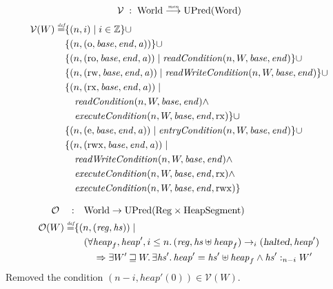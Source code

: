\documentclass{article}
\newcommand{\monfun}{\stackrel{\textit{\tiny{mon}}}{\longrightarrow}}
\newcommand{\defeq}{\stackrel{\textit{\tiny{def}}}{=}}
\newcommand{\union}{\mathbin{\cup}}
\newcommand{\var}[1]{\mathit{#1}}
\newcommand{\hs}{\var{hs}}
\newcommand{\addr}{\var{a}}
\newcommand{\start}{\var{base}}
\newcommand{\addrend}{\var{end}}
\newcommand{\reg}{\var{reg}}
\newcommand{\heap}{\var{heap}}
\newcommand{\perm}{\var{perm}}
\newcommand{\stdcap}[1][\perm]{\left(#1,\start,\addrend,\addr \right)}
\newcommand{\halted}{\textsl{halted}}
\newcommand{\plainfun}[2]{
  \ifthenelse{\equal{#2}{}}
             {\mathit{#1}}
             {\mathit{#1}(#2)}
}
\newcommand{\readCond}[1]{\plainfun{readCondition}{#1}}
\newcommand{\writeCond}[1]{\plainfun{readWriteCondition}{#1}}
\newcommand{\execCond}[1]{\plainfun{executeCondition}{#1}}
\newcommand{\entryCond}[1]{\plainfun{entryCondition}{#1}}
\newcommand{\future}{\mathbin{\sqsupseteq}}
\newcommand{\heapSat}[3][\heap]{#1 :_{#2} #3}
\newcommand{\asmType}{\plaindom{AsmType}}
\newcommand{\plaindom}[1]{\mathrm{#1}}
\newcommand{\Words}{\plaindom{Word}}
\newcommand{\Regs}{\plaindom{Reg}}
\newcommand{\HeapSegments}{\plaindom{HeapSegment}}
\newcommand{\ints}{\mathbb{Z}}
\newcommand{\Worlds}{\plaindom{World}}
\newcommand{\UPred}[1]{\plaindom{UPred}(#1)}
\newcommand{\intr}[2]{\mathcal{#1}}
\newcommand{\valueintr}[1]{\intr{V}{#1}}
\newcommand{\stdvr}{\valueintr{\asmType}}
\newcommand{\observations}{\mathcal{O}}
\newcommand{\npair}[2][n]{\left(#1,#2 \right)}
\newcommand{\plainperm}[1]{\mathrm{#1}}
\newcommand{\noperm}{\plainperm{o}}
\newcommand{\readonly}{\plainperm{ro}}
\newcommand{\readwrite}{\plainperm{rw}}
\newcommand{\exec}{\plainperm{rx}}
\newcommand{\entry}{\plainperm{e}}
\newcommand{\rwx}{\plainperm{rwx}}
\newcommand{\step}[1][]{\rightarrow_{#1}}
\begin{document}
\[
\stdvr \; : \;  \Worlds \monfun \UPred{\Words}
\]
\begin{align*}
  \stdvr(W) \defeq & \{ \npair{i} \mid i \in \ints \} 
\union \\
                   & \{ \npair{\stdcap[\noperm] }  \} 
\union \\
                   & \{ \npair{\stdcap[\readonly] } \mid \readCond{n,W,\start,\addrend} \} \union \\
                   & \{ \npair{\stdcap[\readwrite] } \mid \writeCond{n,W,\start,\addrend} \} \union \\
                   & \{ \npair{\stdcap[\exec]} \mid \\
                   & \quad\readCond{n,W,\start,\addrend} \land \\
                   & \quad \execCond{n,W,\start,\addrend,\exec} \}
\union \\
                   & \{ \npair{\stdcap[\entry]} \mid \entryCond{n,W,\start,\addrend} \} \union \\
                   & \{ \npair{\stdcap[\rwx]} \mid \\
                   & \quad \writeCond{n,W,\start,\addrend} \land \\
                   & \quad \execCond{n,W,\start,\addrend,\exec} \land \\
                   & \quad \execCond{n,W,\start,\addrend,\rwx} \}
\end{align*}

\begin{align*}
  \observations \quad : & \quad  \Worlds \rightarrow \UPred{\Regs \times \HeapSegments} \\
  \observations (W) \defeq & \{ \npair{(\reg,\hs)} \mid \\
                           & \quad (\forall \heap_f, \heap', i \leq n \ldotp (\reg,\hs \uplus \heap_f) \step[i] (\halted,\heap')  \\
                           & \qquad \Rightarrow \exists W' \future W \ldotp\exists \hs' \ldotp \heap' = \hs' \uplus \heap_f \land \heapSat[\hs']{n-i}{W'}
\end{align*}
Removed the condition $\npair[n-i]{\heap'(0)} \in \stdvr(W)$.\\
\end{document}
